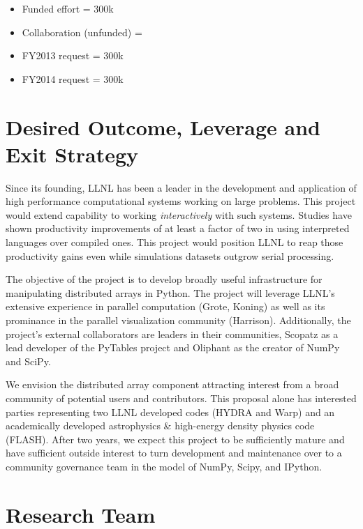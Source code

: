 \documentclass[letterpaper,12pt]{article}
\begin{document}
\begin{itemize}
	\setlength{\itemsep}{0pt}
	\setlength{\parskip}{0pt}
	\setlength{\parsep}{0pt}

	\item Funded effort = 300k
	\item Collaboration (unfunded) =
	\item FY2013 request =  300k
	\item FY2014 request =  300k
\end{itemize}


\section*{Desired Outcome, Leverage and Exit Strategy}

Since its founding, LLNL has been a leader in the development and application of high 
performance computational systems working on large problems.  This project would extend 
capability to working \emph{interactively} with such systems.  Studies have shown productivity 
improvements of at least a factor of two\cite{Prechelt2000} in using interpreted languages 
over compiled ones.  This project would position LLNL to reap those productivity gains even 
while simulations datasets outgrow serial processing.

The objective of the project is to develop broadly useful infrastructure for manipulating 
distributed arrays in Python.  The project will leverage LLNL's extensive experience in 
parallel computation (Grote, Koning) as well as its prominance in the parallel visualization 
community (Harrison).  Additionally, the project's external collaborators are leaders in their 
communities, Scopatz as a lead developer of the PyTables project and Oliphant as the creator of 
NumPy and SciPy.

We envision the distributed array component attracting interest from a broad community 
of potential users and contributors.  This proposal alone has interested parties 
representing two LLNL developed codes (HYDRA and Warp) and an academically developed 
astrophysics \& high-energy density physics code (FLASH).  After two years, we expect this 
project to be sufficiently mature and have sufficient outside interest to turn development 
and maintenance over to a community governance team in the model of NumPy, Scipy, and IPython.



\section*{Research Team}
\end{document}
